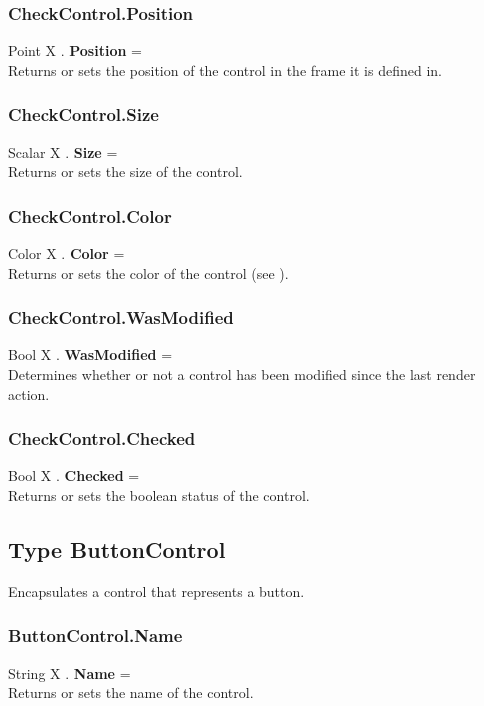\subsubsection{CheckControl.Position \label{F:CheckControl:Position}}
Point X . \textbf{Position} = \\
Returns or sets the position of the control in the frame it is defined in.

\subsubsection{CheckControl.Size \label{F:CheckControl:Size}}
Scalar X . \textbf{Size} = \\
Returns or sets the size of the control.

\subsubsection{CheckControl.Color \label{F:CheckControl:Color}}
Color X . \textbf{Color} = \\
Returns or sets the color of the control (see ).

\subsubsection{CheckControl.WasModified \label{F:CheckControl:WasModified}}
Bool X . \textbf{WasModified} = \\
Determines whether or not a control has been modified since the last render action.

\subsubsection{CheckControl.Checked \label{F:CheckControl:Checked}}
Bool X . \textbf{Checked} = \\
Returns or sets the boolean status of the control.

\subsection{Type ButtonControl \label{T:ButtonControl}}
Encapsulates a control that represents a button.

\subsubsection{ButtonControl.Name \label{F:ButtonControl:Name}}
String X . \textbf{Name} = \\
Returns or sets the name of the control.


